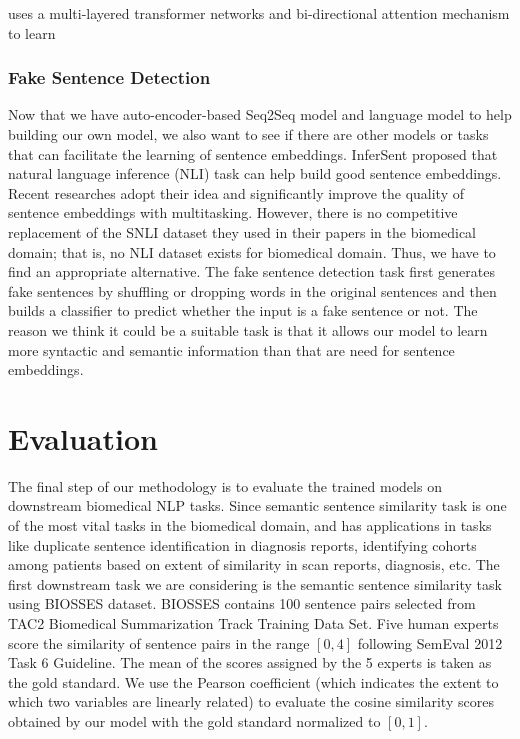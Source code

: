 \documentclass[11pt,a4paper]{article}
\begin{document}
uses a multi-layered transformer networks and bi-directional attention mechanism to learn 
\fi

\subsubsection{Fake Sentence Detection \cite{ranjan2018fake}}
Now that we have auto-encoder-based Seq2Seq model and language model to help building our own model, we also want to see if there are other models or tasks that can facilitate the learning of sentence embeddings. InferSent \cite{conneau2017supervised} proposed that natural language inference (NLI) task can help build good sentence embeddings. Recent researches \cite{subramanian2018learning, cer2018universal} adopt their idea and significantly improve the quality of sentence embeddings with multitasking. However, there is no competitive replacement of the SNLI dataset \cite{bowman2015large} they used in their papers in the biomedical domain; that is, no NLI dataset exists for biomedical domain. Thus, we have to find an appropriate alternative. The fake sentence detection task first generates fake sentences by shuffling or dropping words in the original sentences and then builds a classifier to predict whether the input is a fake sentence or not. The reason we think it could be a suitable task is that it allows our model to learn more syntactic and semantic information than that are need for sentence embeddings.

\section{Evaluation}
The final step of our methodology is to evaluate the trained models on downstream biomedical NLP tasks. Since semantic sentence similarity task is one of the most vital tasks in the biomedical domain, and has applications in tasks like duplicate sentence identification in diagnosis reports, identifying cohorts among patients based on extent of similarity in scan reports, diagnosis, etc. The first downstream task we are considering is the semantic sentence similarity task using BIOSSES dataset. BIOSSES contains 100 sentence pairs selected from TAC2 Biomedical Summarization Track Training Data Set. Five human experts score the similarity of sentence pairs in the range $[0, 4]$ following SemEval 2012 Task 6 Guideline. The mean of the scores assigned by the 5 experts is taken as the gold standard. We use the Pearson coefficient (which indicates the extent to which two variables are linearly related) to evaluate the cosine similarity scores obtained by our model with the gold standard normalized to $[0, 1]$.
\end{document}
